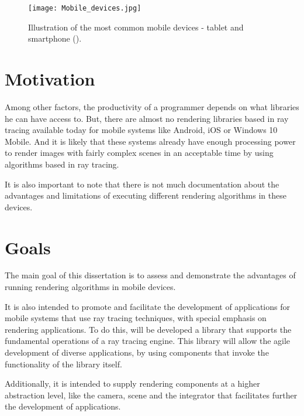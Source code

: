 \begin{figure}[H]
\centering
\caption{Illustration of the most common mobile devices - tablet and smartphone (\cite{JournalDuNet}).}
\label{Illustration of the most common mobile devices - tablet and smartphone}
\texttt{[image: Mobile\_devices.jpg]}
\end{figure}

\section{Motivation}

\par
Among other factors, the productivity of a programmer depends on what libraries he can have access to.
But, there are almost no rendering libraries based in ray tracing available today for mobile systems like Android, iOS or Windows 10 Mobile.
And it is likely that these systems already have enough processing power to render images with fairly complex scenes in an acceptable time by using algorithms based in ray tracing.

\par
It is also important to note that there is not much documentation about the advantages and limitations of executing different rendering algorithms in these devices.

\section{Goals}

\par
The main goal of this dissertation is to assess and demonstrate the advantages of running rendering algorithms in mobile devices.

\par
It is also intended to promote and facilitate the development of applications for mobile systems that use ray tracing techniques, with special emphasis on rendering applications.
To do this, will be developed a library that supports the fundamental operations of a ray tracing engine.
This library will allow the agile development of diverse applications, by using components that invoke the functionality of the library itself.

\par
Additionally, it is intended to supply rendering components at a higher abstraction level, like the camera, scene and the integrator that facilitates further the development of applications.

